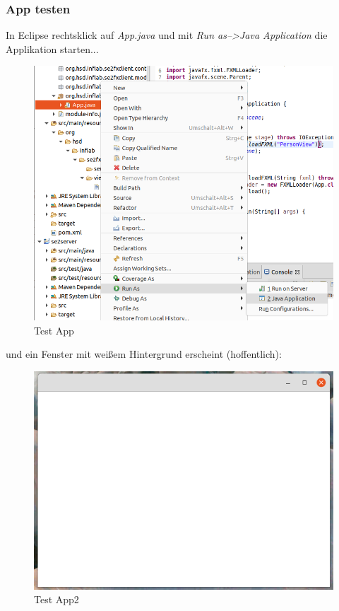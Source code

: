 \documentclass[11pt]{scrartcl}
\begin{document}
\newpage
\subsubsection{App testen}
\label{sec:apptest}
In Eclipse rechtsklick auf \textit{App.java} und mit \textit{Run as-->Java Application}
die Applikation starten...
\begin{figure}[!ht]
    \includegraphics[width=\linewidth]{images/eclipse24_test_app.png}
    \caption{Test App}
    \label{fig:testapp}
\end{figure} und ein Fenster mit weißem Hintergrund erscheint (hoffentlich):
\newpage
\begin{figure}[!ht]
    \includegraphics[width=\linewidth]{images/eclipse25_test_app2.png}
    \caption{Test App2}
    \label{fig:testapp2}
\end{figure}
\end{document}
